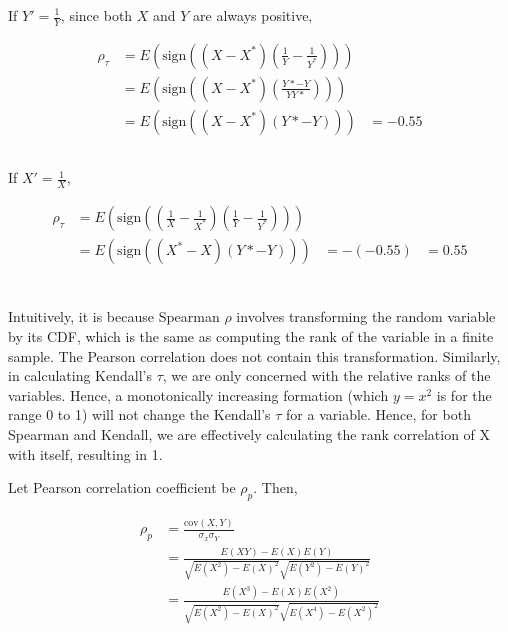 \documentclass[11pt]{scrartcl}
\newcommand{\sign}{\ensuremath{\mathrm{sign}}}
\newcommand{\kt}{\ensuremath{\rho_\tau}}
\newcommand{\cov}{\ensuremath{\mathrm{cov}}}
\begin{document}
If $Y' = \frac{1}{Y}$, since both $X$ and $Y$ are always positive,

\begin{align*}
\kt &= E\left(\sign\left((X-X^*)\left(\frac{1}{Y}-\frac{1}{Y^*}\right)\right)\right) \\
&= E\left(\sign\left((X-X^*)\left(\frac{Y* - Y}{YY*}\right)\right)\right) \\
&= E\left(\sign\left((X-X^*)\left(Y*-Y\right)\right)\right)
&= -0.55
\end{align*}

\subsection{}

If $X' = \frac{1}{X}$,

\begin{align*}
\kt &= E\left(\sign\left(\left(\frac{1}{X} - \frac{1}{X^*}\right)\left(\frac{1}{Y}-\frac{1}{Y^*}\right)\right)\right) \\
&= E\left(\sign\left((X^*-X)\left(Y*-Y\right)\right)\right)
&= -(-0.55)
&= 0.55
\end{align*}

\section{}

Intuitively, it is because Spearman $\rho$ involves transforming the random variable by its CDF, which is the same as computing the rank of the variable in a finite sample. The Pearson correlation does not contain this transformation. Similarly, in calculating Kendall's $\tau$, we are only concerned with the relative ranks of the variables. Hence, a monotonically increasing formation (which $y=x^2$ is for the range 0 to 1) will not change the Kendall's $\tau$ for a variable. Hence, for both Spearman and Kendall, we are effectively calculating the rank correlation of X with itself, resulting in 1.

Let Pearson correlation coefficient be $\rho_p$. Then,

\begin{align*}
\rho_p &= \frac{\cov(X,Y)}{\sigma_x\sigma_Y} \\
&= \frac{E(XY) - E(X)E(Y)}{\sqrt{E(X^2) - E(X)^2}\sqrt{E(Y^2)-E(Y)^2}} \\
&= \frac{E(X^3) - E(X)E(X^2)}{\sqrt{E(X^2) - E(X)^2}\sqrt{E(X^4)-E(X^2)^2}}
\end{align*}
\end{document}
